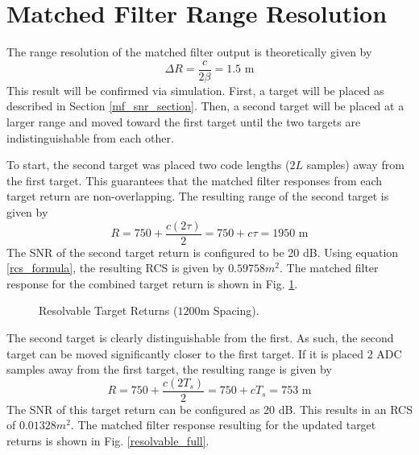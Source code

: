 \documentclass[conference]{IEEEtran}
\begin{document}
\section{Matched Filter Range Resolution} 
The range resolution of the matched filter output is theoretically given by
\begin{equation}
\Delta R = \frac{c}{2\beta} = 1.5 \text{ m}
\end{equation}
This result will be confirmed via simulation. First, a target will be placed as described in Section \ref{mf_snr_section}. Then, a second target will be placed at a larger range and moved toward the first target until the two targets are indistinguishable from each other. 
\par
To start, the second target was placed two code lengths ($2L$ samples) away from the first target. This guarantees that the matched filter responses from each target return are non-overlapping. The resulting range of the second target is given by
\begin{equation}
R = 750 + \frac{c(2\tau)}{2} = 750 + c\tau = 1950 \text{ m}
\end{equation}
The SNR of the second target return is configured to be 20 dB. Using equation \eqref{rcs_formula}, the resulting RCS is given by $0.59758m^2$. The matched filter response for the combined target return is shown in Fig. \ref{mf_output_clearly_resolvable}.
\begin{figure}[H]
\centerline{}
\caption{Resolvable Target Returns ($1200$m Spacing).}
\label{mf_output_clearly_resolvable}
\end{figure}
\par
The second target is clearly distinguishable from the first. As such, the second target can be moved significantly closer to the first target. If it is placed 2 ADC samples away from the first target, the resulting range is given by
\begin{equation}
R = 750 + \frac{c(2T_s)}{2} = 750 + cT_s = 753 \text{ m}
\end{equation}
The SNR of this target return can be configured as 20 dB. This results in an RCS of $0.01328m^2$. The matched filter response resulting for the updated target returns is shown in Fig. \ref{resolvable_full}.
\end{document}
